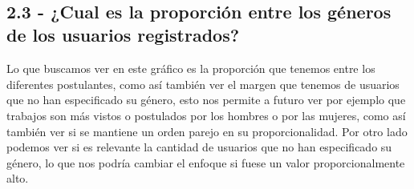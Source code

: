 \documentclass[11pt]{article}
\begin{document}
    \begin{center}
    \end{center}
    { \hspace*{\fill} \\}
    
    \hypertarget{cual-es-la-proporciuxf3n-entre-los-guxe9neros-de-los-usuarios-registrados}{%
\subsection{2.3 - ¿Cual es la proporción entre los géneros de los
usuarios
registrados?}\label{cual-es-la-proporciuxf3n-entre-los-guxe9neros-de-los-usuarios-registrados}}

Lo que buscamos ver en este gráfico es la proporción que tenemos entre
los diferentes postulantes, como así también ver el margen que tenemos
de usuarios que no han especificado su género, esto nos permite a futuro
ver por ejemplo que trabajos son más vistos o postulados por los hombres
o por las mujeres, como así también ver si se mantiene un orden parejo
en su proporcionalidad. Por otro lado podemos ver si es relevante la
cantidad de usuarios que no han especificado su género, lo que nos
podría cambiar el enfoque si fuese un valor proporcionalmente alto.
\end{document}
